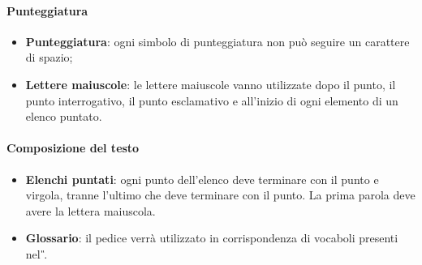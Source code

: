 \paragraph{Punteggiatura}
\begin{itemize}
  \item \textbf{Punteggiatura}: ogni simbolo di punteggiatura non può seguire un
  carattere di spazio;
  \item \textbf{Lettere maiuscole}: le lettere maiuscole vanno utilizzate dopo il punto, il punto interrogativo,
  il punto esclamativo e all'inizio di ogni elemento di un elenco puntato.
\end{itemize}
\paragraph{Composizione del testo}
\begin{itemize}
  \item \textbf{Elenchi puntati}: ogni punto dell'elenco deve terminare con il punto e virgola,
   tranne l'ultimo che deve terminare con il punto. La prima parola deve avere la lettera
   maiuscola.
   \item \textbf{Glossario}: il pedice  verrà utilizzato in corrispondenza di vocaboli presenti nel \textit{\G}.
\end{itemize}
